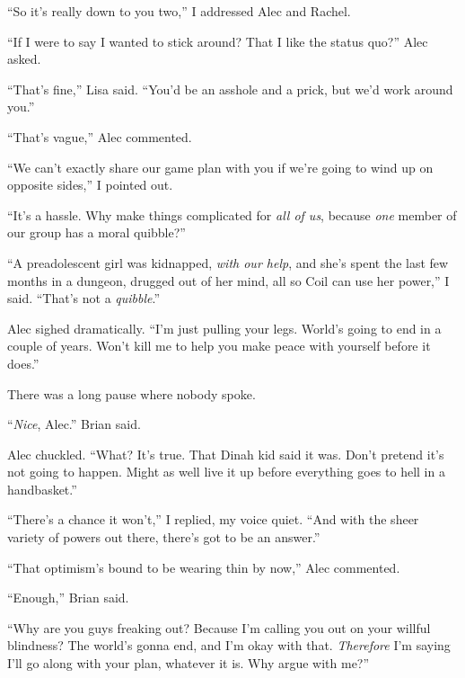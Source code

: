 ``So it's really down to you two,'' I addressed Alec and Rachel.



``If I were to say I wanted to stick around?  That I like the status quo?'' Alec asked.



``That's fine,'' Lisa said.  ``You'd be an asshole and a prick, but we'd work around you.''



``That's vague,'' Alec commented.



``We can't exactly share our game plan with you if we're going to wind up on opposite sides,'' I pointed out.



``It's a hassle.  Why make things complicated for \emph{all of us}, because \emph{one} member of our group has a moral quibble?''



``A preadolescent girl was kidnapped, \emph{with our help}, and she's spent the last few months in a dungeon, drugged out of her mind, all so Coil can use her power,'' I said.  ``That's not a \emph{quibble}.''



Alec sighed dramatically.  ``I'm just pulling your legs.  World's going to end in a couple of years.  Won't kill me to help you make peace with yourself before it does.''



There was a long pause where nobody spoke.



``\emph{Nice}, Alec.'' Brian said.



Alec chuckled.  ``What?  It's true.  That Dinah kid said it was.  Don't pretend it's not going to happen.  Might as well live it up before everything goes to hell in a handbasket.''



``There's a chance it won't,'' I replied, my voice quiet.  ``And with the sheer variety of powers out there, there's got to be an answer.''



``That optimism's bound to be wearing thin by now,'' Alec commented.



``Enough,'' Brian said.



``Why are you guys freaking out?  Because I'm calling you out on your willful blindness?  The world's gonna end, and I'm okay with that.  \emph{Therefore} I'm saying I'll go along with your plan, whatever it is.  Why argue with me?''




